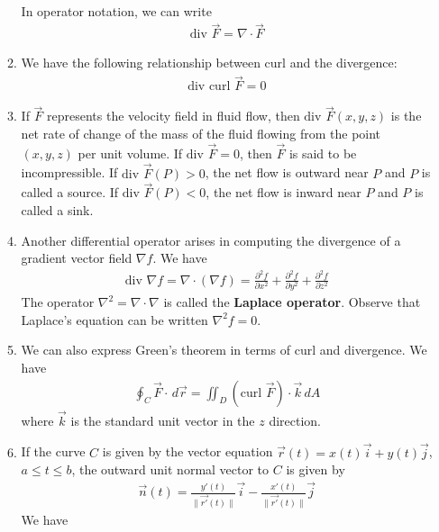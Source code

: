 \documentclass[10pt]{article}
\begin{document}
\begin{multicols}{2}
\begin{enumerate}
\begin{enumerate}
\begin{align*}
        \end{align*}
        In operator notation, we can write
        \begin{align*}
            \text{div }\vec{F} = \nabla \cdot \vec{F}
        \end{align*}
        \item We have the following relationship between curl and the divergence:
        \begin{align*}
            \text{div curl }\vec{F}=0
        \end{align*}
        \item If $\vec{F}$ represents the velocity field in fluid flow, then $\text{div }\vec{F}(x,y,z)$ is the net rate of change of the mass of the fluid flowing from the point  $(x,y,z)$ per unit volume. If $\text{div }\vec{F}=0$, then $\vec{F}$ is said to be incompressible. If $\text{div }\vec{F}(P)>0$, the net flow is outward near $P$ and $P$ is called a source. If $\text{div }\vec{F}(P)<0$, the net flow is inward near $P$ and $P$ is called a sink. 
        \item Another differential operator arises in computing the divergence of a gradient vector field $\nabla f$. We have
        \begin{align*}
            \text{div } \nabla f = \nabla \cdot (\nabla f) = \frac{\partial^2 f}{\partial x^2} + \frac{\partial^2 f}{\partial y^2} + \frac{\partial^2 f}{\partial z^2} 
        \end{align*}
        The operator $\nabla^2 = \nabla \cdot \nabla$ is called the \textbf{Laplace operator}. Observe that Laplace's equation can be written $\nabla^2 f= 0$.
        \item We can also express Green's theorem in terms of curl and divergence. We have 
        \begin{align*}
            \oint_C \vec{F} \cdot \,d\vec{r} = \iint_D (\text{curl }\vec{F}) \cdot \vec{k} \,dA
        \end{align*}
        where $\vec{k}$ is the standard unit vector in the $z$ direction. 
        \item If the curve $C$ is given by the vector equation $\vec{r}(t)=x(t)\vec{i} + y(t)\vec{j}$, $a \leq t \leq b$, the outward unit normal vector to $C$ is given by
        \begin{align*}
            \vec{n}(t) = \frac{y'(t)}{\| \vec{r'}(t) \|}\vec{i} - \frac{x'(t)}{\| \vec{r'}(t) \|}\vec{j}
        \end{align*}
        We have
        \begin{align*}

\end{align*}
\end{enumerate}
\end{enumerate}
\end{multicols}
\end{document}
